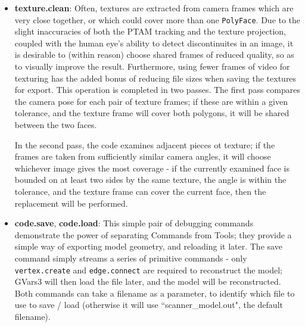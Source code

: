 \documentclass[a4paper,10pt]{report}
\begin{document}
\begin{itemize}
\item{\textbf{texture.clean}: Often, textures are extracted from camera frames which are very close together, or which could cover more than one \texttt{PolyFace}. Due to the slight inaccuracies of both the PTAM tracking and the texture projection, coupled with the human eye's ability to detect discontinuites in an image, it is desirable to (within reason) choose shared frames of reduced quality, so as to visually improve the result. Furthermore, using fewer frames of video for texturing has the added bonus of reducing file sizes when saving the textures for export. This operation is completed in two passes. The first pass compares the camera pose for each pair of texture frames; if these are within a given tolerance, and the texture frame will cover both polygons, it will be shared between the two faces.

In the second pass, the code examines adjacent pieces ot texture; if the frames are taken from sufficiently similar camera angles, it will choose whichever  image gives the most coverage - if the currently examined face is bounded on at least two sides by the same texture, the angle is within the tolerance, and the texture frame can cover the current face, then the replacement will be performed.}
\item{\textbf{code.save}, \textbf{code.load}: This simple pair of debugging commands demonstrate the power of separating Commands from Tools; they provide a simple way of exporting model geometry, and reloading it later. The save command simply streams a series of primitive commands - only \texttt{vertex.create} and \texttt{edge.connect} are required to reconstruct the model; GVars3 will then load the file later, and the model will be reconstructed. Both commands can take a filename as a parameter, to identify which file to use to save / load (otherwise it will use ``scanner\_model.out", the default filename).}


\end{itemize}
\end{document}
